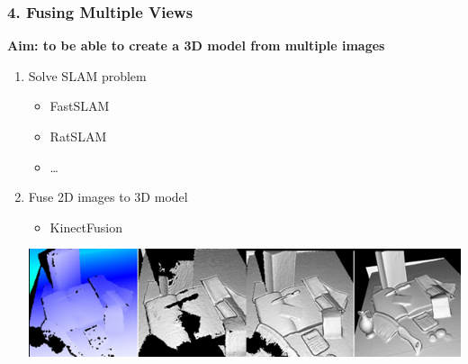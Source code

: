 \begin{frame}[c] \frametitle{4. Fusing Multiple Views}

	\textbf{Aim: to be able to create a 3D model from multiple images}

	\medskip

	\begin{enumerate}

		\item Solve SLAM problem

		\begin{itemize}\itemsep10pt
			\item FastSLAM
			\item RatSLAM
			\item \ldots
		\end{itemize}

		\medskip

		\item Fuse 2D images to 3D model

		\begin{itemize}\itemsep10pt
			\item KinectFusion
		\end{itemize}

		\vfill

		\centering
		\includegraphics[width=.8\linewidth]{src/kinectfusion.png}

	\end{enumerate}



\end{frame}


